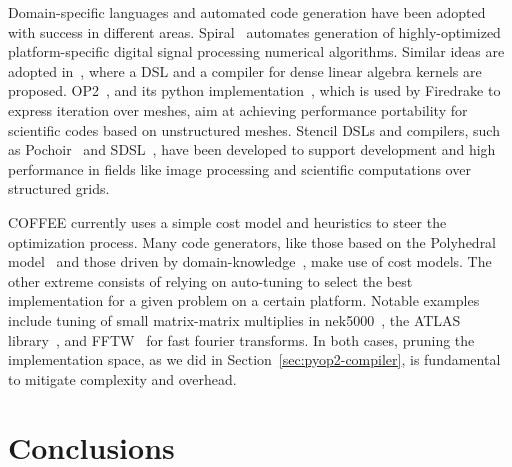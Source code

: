 \documentclass[conference]{IEEEtran}
\begin{document}
Domain-specific languages and automated code generation have been adopted with success in different areas. Spiral~\cite{Pueschel:05} automates generation of highly-optimized platform-specific digital signal processing numerical algorithms. Similar ideas are adopted in~\cite{Spampinato:14}, where a DSL and a compiler for dense linear algebra kernels are proposed. OP2~\cite{op2-main}, and its python implementation~\cite{pyop2isc}, which is used by Firedrake to express iteration over meshes, aim at achieving performance portability for scientific codes based on unstructured meshes. Stencil DSLs and compilers, such as Pochoir~\cite{pochoir} and SDSL~\cite{stencil-compiler}, have been developed to support development and high performance in fields like image processing and scientific computations over structured grids.  

COFFEE currently uses a simple cost model and heuristics to steer the optimization process. Many code generators, like those based on the Polyhedral model~\cite{PLUTO} and those driven by domain-knowledge~\cite{modeldriven}, make use of cost models. The other extreme consists of relying on auto-tuning to select the best implementation for a given problem on a certain platform. Notable examples include tuning of small matrix-matrix multiplies in nek5000~\cite{nek5000}, the ATLAS library~\cite{ATLAS}, and FFTW~\cite{FFTW} for fast fourier transforms. In both cases, pruning the implementation space, as we did in Section~\ref{sec:pyop2-compiler}, is fundamental to mitigate complexity and overhead. 




\section{Conclusions}
\label{sec:conclusions}
\end{document}

